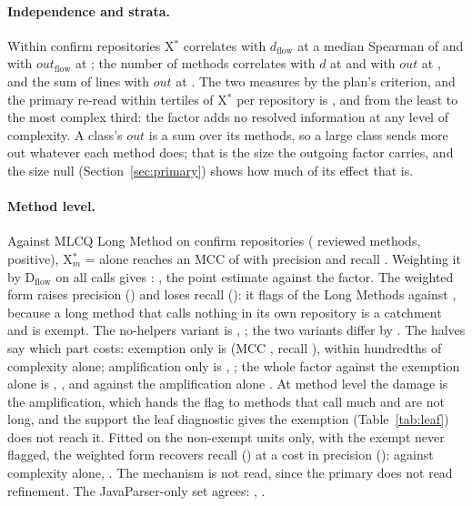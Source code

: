 \documentclass[11pt,a4paper]{article}
\newcommand{\sig}[1]{\texttt{#1}}
\newcommand{\Xs}{X$^*$}
\newcommand{\Xm}{X$^*_m$}
\newcommand{\Dflow}{D$_{\text{flow}}$}
\begin{document}
\paragraph{Independence and strata.} Within confirm repositories \Xs{}
correlates with $d_{\text{flow}}$ at a median Spearman of \rhoXD{} and with
$\mathit{out}_{\text{flow}}$ at \rhoXOut{}; the number of methods
correlates with $d$ at \rhoNomD{} and with $\mathit{out}$ at \rhoNomOut{},
and the sum of lines with $\mathit{out}$ at \rhoNlocSumOut{}. The two
measures \trackClosely{} by the plan's criterion, and the primary re-read
within tertiles of \Xs{} per repository is \tertileOne{}, \tertileTwo{} and
\tertileThree{} from the least to the most complex third: the factor adds no
resolved information at any level of complexity. A class's $\mathit{out}$ is
a sum over its methods, so a large class sends more out whatever each method
does; that is the size the outgoing factor carries, and the size null
(Section~\ref{sec:primary}) shows how much of its effect that is.

\paragraph{Method level.} Against MLCQ Long Method on \methRepos{} confirm
repositories (\methUniv{} reviewed methods, \methPos{} positive), \Xm{} =
\sig{\xMethod} alone reaches an MCC of \methXMcc{} with precision
\methXPrecision{} and recall \methXRecall{}. Weighting it by \Dflow{} on all
calls gives \methMicro{}: \methReading{}, the point estimate against the
factor. The weighted form raises precision (\methDPrecision{}) and loses
recall (\methDRecall{}): it flags \methDTp{} of the \methPos{} Long Methods
against \methXTp{}, because a long method that calls nothing in its own
repository is a catchment and is exempt. The no-helpers variant is
\methNoHelpMicro{}, \methNoHelpReading{}; the two variants differ by
\methNoHelpVsAllMicro{}. The halves say which part costs: exemption only is
\methEMicro{} (MCC \methEMcc{}, recall \methERecall{}), within hundredths
of complexity alone; amplification only is \methAmpMicro{},
\methAmpReading{}; the whole factor against the exemption alone is
\methDvsEMicro{}, \methDvsEReading{}, and against the amplification alone
\methDvsAMicro{}. At method level the damage is the amplification, which
hands the flag to methods that call much and are not long, and the support
the leaf diagnostic gives the exemption (Table~\ref{tab:leaf}) does not
reach it. Fitted on the non-exempt units only, with the exempt never
flagged, the weighted form recovers recall (\methNeRecall{}) at a cost in
precision (\methNePrecision{}): \methNeVsXMicro{} against complexity alone,
\methNeVsXReading{}. The mechanism is not read, since the primary does not
read refinement. The JavaParser-only set agrees: \methJpMicro{},
\methJpReading{}.
\end{document}
